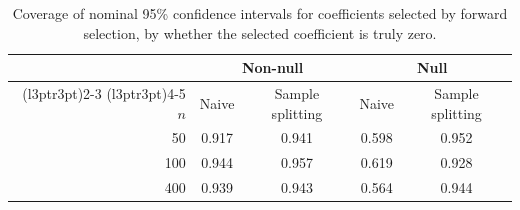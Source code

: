 \begin{table}

\caption{\label{tab:coverage}Coverage of nominal 95\% confidence intervals for coefficients selected by forward selection, by whether the selected coefficient is truly zero.}
\centering
\begin{tabular}[t]{rcccc}
\toprule
\multicolumn{1}{c}{ } & \multicolumn{2}{c}{Non-null} & \multicolumn{2}{c}{Null} \\
\cmidrule(l{3pt}r{3pt}){2-3} \cmidrule(l{3pt}r{3pt}){4-5}
$n$ & Naive & Sample splitting & Naive & Sample splitting\\
\midrule
50 & 0.917 & 0.941 & 0.598 & 0.952\\
100 & 0.944 & 0.957 & 0.619 & 0.928\\
400 & 0.939 & 0.943 & 0.564 & 0.944\\
\bottomrule
\end{tabular}
\end{table}
